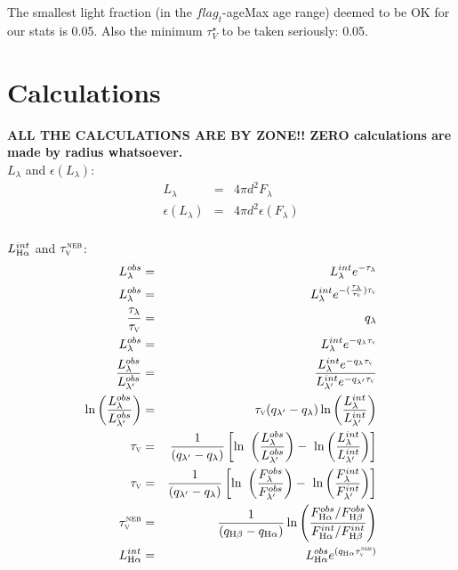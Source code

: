 \documentclass[a4paper,12pt]{article}
\newcommand{\tauV}{\tau_{\mathrm{\textsc{v}}}}
\newcommand{\tauVN}{\tau_{\mathrm{\textsc{v}}}^{\mathrm{\textsc{neb}}}}
\newcommand{\Halpha}{\ifmmode \mathrm{H}\alpha \else H$\alpha$\xspace \fi}
\newcommand{\Hbeta}{\ifmmode \mathrm{H}\beta \else H$\beta$\xspace \fi}
\begin{document}
The smallest light fraction (in the $flag_t$-ageMax age range) deemed to be OK for our stats is 0.05. Also the minimum $\tau_V^\star$ to be taken seriously: 0.05.

\section{Calculations}

\textbf{ALL THE CALCULATIONS ARE BY ZONE!! ZERO calculations are made by radius whatsoever.}
\\

$L_\lambda$ and $\epsilon (L_\lambda)$:
\begin{eqnarray}
	L_\lambda &=& 4 \pi d^2 F_\lambda \\
	\epsilon (L_\lambda) &=& 4 \pi d^2 \epsilon (F_\lambda)
\end{eqnarray}
\\

$L_{\Halpha}^{int}$ and $\tauVN$: 
\begin{eqnarray}
	L_\lambda^{obs} &=& L_\lambda^{int} e^{-\tau_\lambda} \\
	L_\lambda^{obs} &=& L_\lambda^{int} e^{-(\frac{\tau_\lambda}{\tauV}) \tauV} \\
	\frac{\tau_\lambda}{\tauV} &=& q_\lambda \\
	L_\lambda^{obs} &=& L_\lambda^{int} e^{-q_\lambda \tauV} \\
	\frac{L_\lambda^{obs}}{L_{\lambda^\prime}^{obs}} &=& \
\frac{L_\lambda^{int} e^{-q_\lambda \tauV}}{L_{\lambda^\prime}^{int} e^{-q_{\lambda^\prime} \tauV}} \\
	\ln \left(\frac{L_\lambda^{obs}}{L_{\lambda^\prime}^{obs}}\right) &=& \
\tauV (q_{\lambda^\prime} - q_\lambda) \ln \left(\frac{L_\lambda^{int}}{L_{\lambda^\prime}^{int}}\right) \\
	\tauV &=& \frac{1}{(q_{\lambda^\prime} - q_\lambda)} \left[\ln \ 
\left(\frac{L_\lambda^{obs}}{L_{\lambda^\prime}^{obs}}\right) - \
\ln \left(\frac{L_\lambda^{int}}{L_{\lambda^\prime}^{int}}\right)\right] \\
	\tauV &=& \frac{1}{(q_{\lambda^\prime} - q_\lambda)} \left[\ln \
\left(\frac{F_\lambda^{obs}}{F_{\lambda^\prime}^{obs}}\right) - \
\ln \left(\frac{F_\lambda^{int}}{F_{\lambda^\prime}^{int}}\right)\right] \\
	\tauVN &=& \frac{1}{(q_{\Hbeta} - q_{\Halpha})} \ln \left( \frac{ F_{\Halpha}^{obs} / F_{\Hbeta}^{obs}}{F_{\Halpha}^{int} / F_{\Hbeta}^{int}} \right) \\
	L_{\Halpha}^{int} &=& L_{\Halpha}^{obs} e^{(q_{\Halpha} \tauVN)} 
\end{eqnarray}
\\
\end{document}
